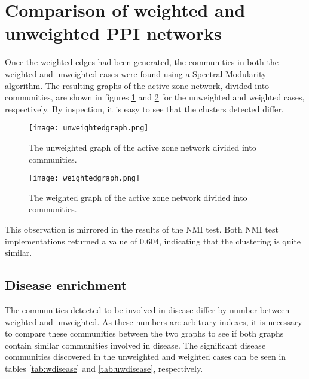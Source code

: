 
\section{Comparison of weighted and unweighted \ac{PPI} networks}

Once the weighted edges had been generated, the communities in both the weighted and unweighted cases were found using a Spectral Modularity algorithm.
The resulting graphs of the active zone network, divided into communities, are shown in figures \ref{fig:uwgraph} and \ref{fig:wgraph} for the unweighted and weighted cases, respectively.
By inspection, it is easy to see that the clusters detected differ.

\begin{figure}
    \centering
    \texttt{[image: unweightedgraph.png]}
    \caption{The unweighted graph of the active zone network divided into communities.}
    \label{fig:uwgraph}
\end{figure}

\begin{figure}
    \centering
    \texttt{[image: weightedgraph.png]}
    \caption{The weighted graph of the active zone network divided into communities.}
    \label{fig:wgraph}
\end{figure}


This observation is mirrored in the results of the NMI test.
Both NMI test implementations returned a value of 0.604, indicating that the clustering is quite similar.

\subsection{Disease enrichment}
The communities detected to be involved in disease differ by number between weighted and unweighted.
As these numbers are arbitrary indexes, it is necessary to compare these communities between the two graphs to see if both graphs contain similar communities involved in disease.
The significant disease communities discovered in the unweighted and weighted cases can be seen in tables \ref{tab:wdisease} and \ref{tab:uwdisease}, respectively.

